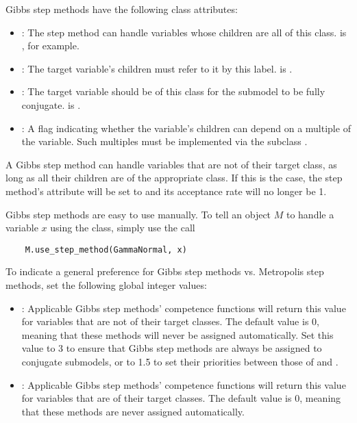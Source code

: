 Gibbs step methods have the following class attributes:
\begin{itemize}
    \item {}: The step method can handle variables whose children are all of this class.  is , for example.
    \item {}: The target variable's children must refer to it by this label.  is .
    \item {}: The target variable should be of this class for the submodel to be fully conjugate.  is .
    \item {}: A flag indicating whether the variable's children can depend on a multiple of the variable. Such multiples must be implemented via the  subclass .
\end{itemize}

A Gibbs step method can handle variables that are not of their target class, as long as all their children are of the appropriate class. If this is the case, the step method's  attribute will be set to  and its acceptance rate will no longer be 1.

Gibbs step methods are easy to use manually. To tell an 
object $M$ to handle a variable $x$ using the  class,
simply use the call
\begin{verbatim}
    M.use_step_method(GammaNormal, x)
\end{verbatim}

To indicate a general preference for Gibbs step methods vs. Metropolis step methods, set the following global integer values:
\begin{itemize}
    \item {}: Applicable Gibbs step methods' competence functions will return this value for variables that are not of their target classes. The default value is 0, meaning that these methods will never be assigned automatically. Set this value to 3 to ensure that Gibbs step methods are always be assigned to conjugate submodels, or to 1.5 to set their priorities between those of  and .
    \item {}: Applicable Gibbs step methods' competence functions will return this value for variables that are of their target classes. The default value is 0, meaning that these methods are never assigned automatically.
\end{itemize}


